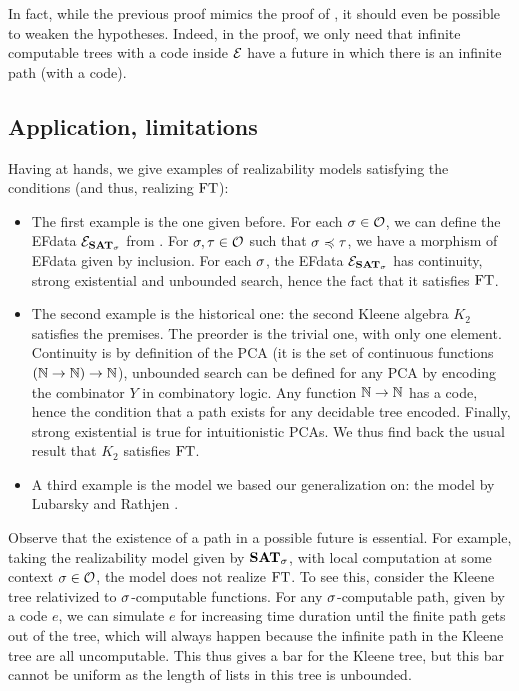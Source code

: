\documentclass[a4paper,UKenglish,cleveref, autoref, thm-restate]{lipics-v2021}
\begin{document}
\begin{remark}
  In fact, while the previous proof mimics the proof of , it should even be possible to weaken the hypotheses. Indeed, in the proof, we only need that infinite computable trees with a code inside $\mathcal{E}$ have a future in which there is an infinite path (with a code).
\end{remark}


\subsection{Application, limitations}
\label{s:application}
Having  at hands, we give examples of realizability models satisfying the conditions (and thus, realizing $\mathrm{FT}$):

\begin{itemize}
\item The first example is the one given before. For each $\sigma \in \mathcal O$, we can define the EFdata $\mathcal{E}_{{\mathbf{SAT}}_{\sigma}}$ from . For $\sigma, \tau \in \mathcal O$ such that $\sigma\preccurlyeq \tau$, we have a morphism of EFdata given by inclusion. For each $\sigma$, the EFdata $\mathcal{E}_{{\mathbf{SAT}}_{\sigma}}$ has continuity, strong existential and unbounded search, hence the fact that it satisfies $\mathrm{FT}$.

\item The second example is the historical one: the second Kleene algebra $K_2$ \cite{Kleene1965} satisfies the premises. The preorder is the trivial one, with only one element. Continuity is by definition of the PCA (it is the set of continuous functions $(\mathbb N \to \mathbb N) \to \mathbb N$), unbounded search can be defined for any PCA by encoding the combinator $Y$ in combinatory logic. Any function $\mathbb N \to \mathbb N$ has a code, hence the condition that a path exists for any decidable tree encoded. Finally, strong existential is true for intuitionistic PCAs. We thus find back the usual result that $K_2$ satisfies $\mathrm{FT}$.

\item A third example is the model we based our generalization on: the model by Lubarsky and Rathjen \cite{LubRat13}.
\end{itemize}

Observe that the existence of a path in a possible future is essential. For example, taking the realizability model given by ${\mathbf{SAT}}_{\sigma}$, with local computation at some context $\sigma\in\mathcal O$, the model does not realize $\mathrm{FT}$. To see this, consider the Kleene tree relativized to $\sigma$-computable functions. For any $\sigma$-computable path, given by a code $e$, we can simulate $e$ for increasing time duration until the finite path gets out of the tree, which will always happen because the infinite path in the Kleene tree are all uncomputable. This thus gives a bar for the Kleene tree, but this bar cannot be uniform as the length of lists in this tree is unbounded.
\end{document}
